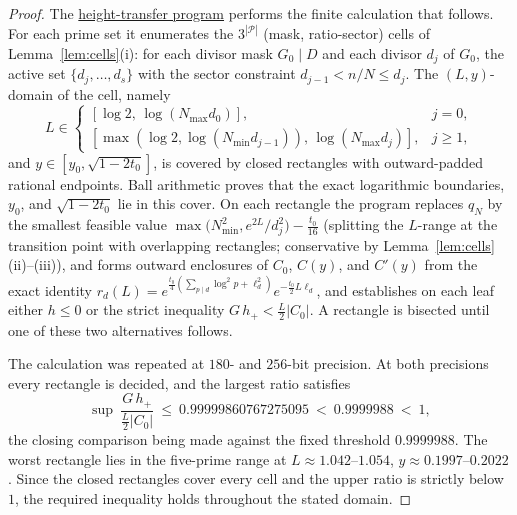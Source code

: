 \documentclass[11pt]{article}
\theoremstyle{definition}
\newcommand{\calP}{\mathcal{P}}
\newcommand{\programlink}[2]{\href{https://github.com/judegomila/dbn-lambda-01787854-candidate-audit/blob/6222740efae58d773a70ff929cf12a34932d2af0/#1}{#2}}
\begin{document}
\begin{proof}
The
\programlink{dan-reworking/code/prop49/prop49_proof.c}{height-transfer program}
performs the finite calculation that follows.  For each prime set it
enumerates the $3^{|\calP|}$
(mask, ratio-sector) cells of Lemma~\ref{lem:cells}(i): for each
divisor mask $G_0\mid D$ and each divisor $d_j$ of $G_0$, the
active set $\{d_j,\dots,d_s\}$ with the sector constraint
$d_{j-1}<n/N\le d_j$. The $(L,y)$-domain of the cell, namely
\[
L\in
\begin{cases}
[\log2,\,\log(N_{\max}d_0)],&j=0,\\
[\max(\log2,\log(N_{\min}d_{j-1})),\,\log(N_{\max}d_j)],&j\ge1,
\end{cases}
\]
and
$y\in[y_0,\sqrt{1-2t_0}]$, is covered by closed rectangles with
outward-padded rational endpoints.  Ball arithmetic proves that the exact
logarithmic boundaries, $y_0$, and $\sqrt{1-2t_0}$ lie in this cover.  On
each rectangle the program replaces $q_N$ by the smallest feasible
value $\max\bigl(N_{\min}^2,e^{2L}/d_j^2\bigr)-\frac{t_0}{16}$
(splitting the $L$-range at the transition point with overlapping
rectangles; conservative by Lemma~\ref{lem:cells}(ii)--(iii)), and forms
outward enclosures of $C_0$, $C(y)$, and $C'(y)$ from the exact identity
$r_d(L)=e^{\frac{t_0}4(\sum_{p\mid d}\log^2p+\ell_d^2)}
e^{-\frac{t_0}2L\ell_d}$, and establishes on each leaf either
$h\le0$ or the strict inequality $G\,h_+<\frac L2|C_0|$.  A rectangle is
bisected until one of these two alternatives follows.

The calculation was repeated at $180$- and $256$-bit precision.  At both
precisions every rectangle is decided, and the largest ratio satisfies
\[
\sup\ \frac{G\,h_+}{\frac L2|C_0|}\ \le\ 0.99999860767275095
\ <\ 0.9999988\ <\ 1 ,
\]
the closing comparison being made against the fixed threshold
$0.9999988$. The worst rectangle lies in the five-prime range at
$L\approx1.042$--$1.054$, $y\approx0.1997$--$0.2022$.  Since the
closed rectangles cover every cell and the upper ratio is strictly below
$1$, the required inequality holds throughout the stated domain.
\end{proof}
\end{document}
